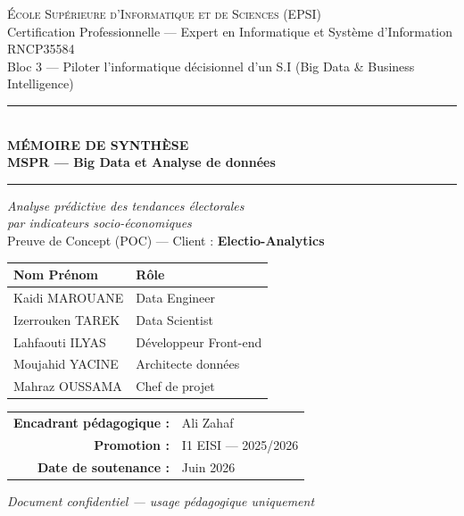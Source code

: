 \documentclass[12pt,a4paper,oneside]{report}
\begin{document}
\begin{titlepage}
\centering
{\large\textsc{École Supérieure d'Informatique et de Sciences (EPSI)}}\\[0.3cm]
{\large Certification Professionnelle — Expert en Informatique et Système d'Information}\\
{\large RNCP35584}\\[0.2cm]
{\normalsize Bloc 3 — Piloter l'informatique décisionnel d'un S.I (Big Data \& Business Intelligence)}

\vspace{1.5cm}
\rule{\linewidth}{0.5pt}\\[0.4cm]
{\Huge\bfseries MÉMOIRE DE SYNTHÈSE}\\[0.3cm]
{\LARGE\bfseries MSPR — Big Data et Analyse de données}\\[0.4cm]
\rule{\linewidth}{0.5pt}

\vspace{0.8cm}
{\Large\itshape Analyse prédictive des tendances électorales\\par indicateurs socio-économiques}\\[0.4cm]
{\large Preuve de Concept (POC) — Client : \textbf{Electio-Analytics}}

\vspace{1.5cm}
\begin{tabular}{ll}
\toprule
\textbf{Nom Prénom} & \textbf{Rôle} \\
\midrule
Kaidi MAROUANE      & Data Engineer \\
Izerrouken TAREK    & Data Scientist \\
Lahfaouti ILYAS     & Développeur Front-end \\
Moujahid YACINE     & Architecte données \\
Mahraz OUSSAMA      & Chef de projet \\
\bottomrule
\end{tabular}

\vspace{1.5cm}
\begin{tabular}{rl}
\textbf{Encadrant pédagogique :} & Ali Zahaf \\
\textbf{Promotion :}             & I1 EISI — 2025/2026 \\
\textbf{Date de soutenance :}    & Juin 2026 \\
\end{tabular}

\vfill
{\small\itshape Document confidentiel — usage pédagogique uniquement}
\end{titlepage}
\end{document}
